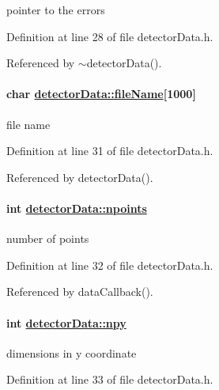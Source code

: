 pointer to the errors 



Definition at line 28 of file detector\-Data.h.

Referenced by $\sim$detector\-Data().\hypertarget{classdetectorData_91d1e3466878def295a531c01bdeef6b}{
\paragraph[fileName]{\setlength{\rightskip}{0pt plus 5cm}char \hyperlink{classdetectorData_91d1e3466878def295a531c01bdeef6b}{detector\-Data::file\-Name}\mbox{[}1000\mbox{]}}\hfill}
\label{classdetectorData_91d1e3466878def295a531c01bdeef6b}


file name 



Definition at line 31 of file detector\-Data.h.

Referenced by detector\-Data().\hypertarget{classdetectorData_50aabf6f2c40587f8e915cf4913a2cfe}{
\paragraph[npoints]{\setlength{\rightskip}{0pt plus 5cm}int \hyperlink{classdetectorData_50aabf6f2c40587f8e915cf4913a2cfe}{detector\-Data::npoints}}\hfill}
\label{classdetectorData_50aabf6f2c40587f8e915cf4913a2cfe}


number of points 



Definition at line 32 of file detector\-Data.h.

Referenced by data\-Callback().\hypertarget{classdetectorData_c289d259e7fd9445a9c04976a82cb324}{
\paragraph[npy]{\setlength{\rightskip}{0pt plus 5cm}int \hyperlink{classdetectorData_c289d259e7fd9445a9c04976a82cb324}{detector\-Data::npy}}\hfill}
\label{classdetectorData_c289d259e7fd9445a9c04976a82cb324}


dimensions in y coordinate 



Definition at line 33 of file detector\-Data.h.

